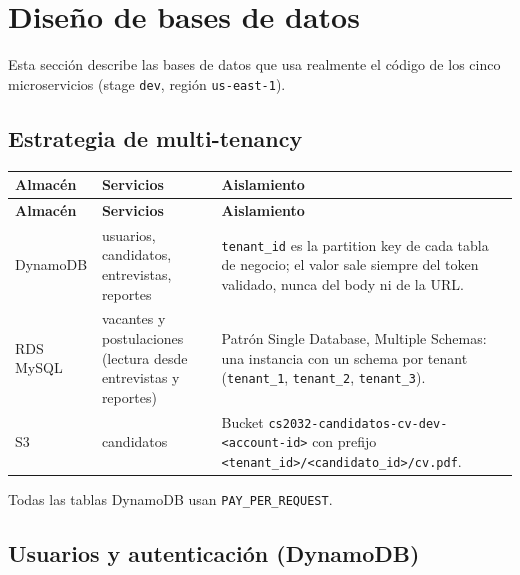 \providecommand{\bdjson}{}
\bdjson
\section{Diseño de bases de datos}
Esta sección describe las bases de datos que usa realmente el código de los cinco microservicios (stage \texttt{dev}, región \texttt{us-\allowbreak{}east-\allowbreak{}1}).

\subsection{Estrategia de multi-tenancy}
\begin{longtable}{p{2.6cm}p{4.4cm}p{7cm}}
\toprule
\textbf{Almacén} & \textbf{Servicios} & \textbf{Aislamiento} \\
\midrule
\endfirsthead
\toprule
\textbf{Almacén} & \textbf{Servicios} & \textbf{Aislamiento} \\
\midrule
\endhead
\bottomrule
\endlastfoot
DynamoDB & usuarios, candidatos, entrevistas, reportes & \texttt{tenant\_\allowbreak{}id} es la partition key de cada tabla de negocio; el valor sale siempre del token validado, nunca del body ni de la URL. \\
RDS MySQL & vacantes y postulaciones (lectura desde entrevistas y reportes) & Patrón Single Database, Multiple Schemas: una instancia con un schema por tenant (\texttt{tenant\_\allowbreak{}1}, \texttt{tenant\_\allowbreak{}2}, \texttt{tenant\_\allowbreak{}3}). \\
S3 & candidatos & Bucket \texttt{cs2032-\allowbreak{}candidatos-\allowbreak{}cv-\allowbreak{}dev-\allowbreak{}\textless{}account-\allowbreak{}id\textgreater{}} con prefijo \texttt{\textless{}tenant\_\allowbreak{}id\textgreater{}/\textless{}candidato\_\allowbreak{}id\textgreater{}/cv.pdf}. \\
\end{longtable}

Todas las tablas DynamoDB usan \texttt{PAY\_\allowbreak{}PER\_\allowbreak{}REQUEST}.

\subsection{Usuarios y autenticación (DynamoDB)}
